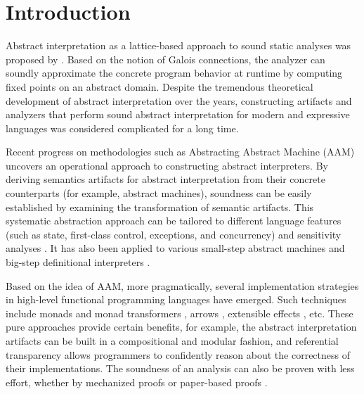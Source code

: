 \section{Introduction} \label{intro}

Abstract interpretation as a lattice-based approach to sound static analyses was
proposed by \citet{DBLP:conf/popl/CousotC77, CousotCousot79-1}. Based on the notion of Galois
connections, the analyzer can soundly approximate the
concrete program behavior at runtime by computing fixed points on an abstract
domain. Despite the tremendous theoretical development of abstract
interpretation over the years, constructing artifacts and analyzers that perform
sound abstract interpretation for modern and expressive languages was considered
complicated for a long time.

Recent progress on methodologies such as Abstracting Abstract Machine (AAM)
\cite{DBLP:journals/jfp/HornM12, DBLP:conf/icfp/HornM10} uncovers an
operational approach to constructing abstract interpreters.  By deriving
semantics artifacts for abstract interpretation from their concrete
counterparts (for example, abstract machines), soundness can be easily
established by examining the transformation of semantic artifacts.
This systematic abstraction approach can be tailored to different
language features (such as state, first-class control, exceptions, and
concurrency) and sensitivity analyses \cite{DBLP:conf/icfp/Gilray0M16,
  DBLP:conf/popl/GilrayL0MH16, Darais:2015:GTM:2814270.2814308}. It
has also been applied to various small-step abstract machines
\cite{DBLP:journals/jfp/HornM12, DBLP:conf/icfp/HornM10,
  Sergey:2013:MAI:2491956.2491979} and big-step definitional
interpreters \cite{Wei:2018:RAA:3243631.3236800,
  DBLP:journals/pacmpl/DaraisLNH17, Keidel:2018:CSP:3243631.3236767}.


Based on the idea of AAM, more pragmatically, several implementation strategies
in high-level functional programming languages have emerged.  Such techniques
include monads and monad transformers \cite{DBLP:journals/pacmpl/DaraisLNH17,
Sergey:2013:MAI:2491956.2491979}, arrows
\cite{Keidel:2018:CSP:3243631.3236767}, extensible effects
\cite{Kiselyov:2015:FMM:2804302.2804319, Githubsemantic}, etc. These pure
approaches provide certain benefits, for example, the abstract interpretation
artifacts can be built in a compositional and modular fashion, and referential
transparency allows programmers to confidently reason about the correctness of
their implementations.  The soundness of an analysis can also be proven with less
effort, whether by mechanized proofs \cite{Darais:2016:CGC:2951913.2951934} or
paper-based proofs \cite{Keidel:2018:CSP:3243631.3236767}.  

